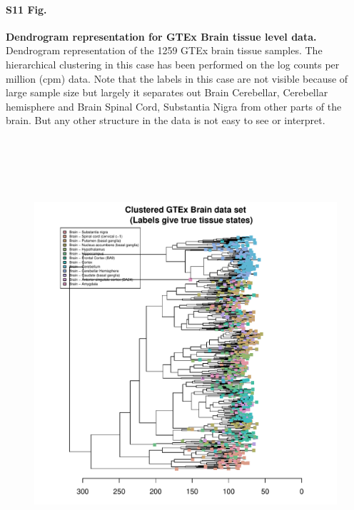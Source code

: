 \documentclass[10pt,letterpaper]{article}
\begin{document}
\paragraph*{S11 Fig.}

\label{figS11}
{\bf Dendrogram representation for GTEx Brain tissue level data.} Dendrogram representation of the 1259 GTEx brain tissue samples.
The hierarchical clustering in this case has been performed on the log counts per million (cpm) data.
Note that the labels in this case are not visible because of large sample size but largely it separates out
Brain Cerebellar, Cerebellar hemisphere  and Brain Spinal Cord, Substantia Nigra from other parts of the brain. But any other structure in the data is not easy to see or interpret.
\begin{figure}[ht]
\centering
\includegraphics[height=6.3in, width=6in]{../../plots/dendextend_gtex_brain.pdf}
\end{figure}
\end{document}
